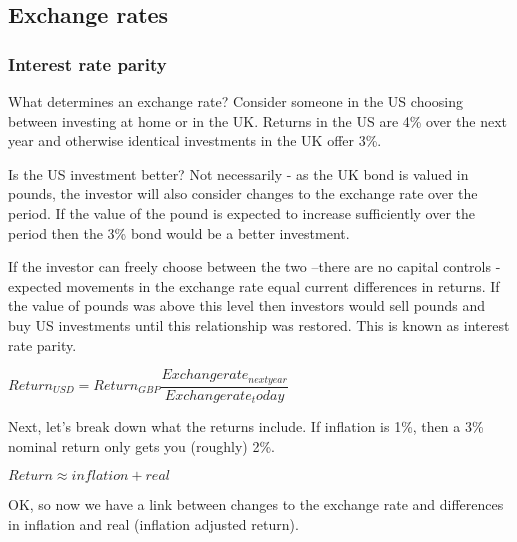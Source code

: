 
\subsection{Exchange rates}

\subsubsection{Interest rate parity}

What determines an exchange rate? Consider someone in the US choosing between investing at home or in the UK. Returns in the US are 4\% over the next year and otherwise identical investments in the UK offer 3\%.

Is the US investment better? Not necessarily - as the UK bond is valued in pounds, the investor will also consider changes to the exchange rate over the period. If the value of the pound is expected to increase sufficiently over the period then the 3\% bond would be a better investment.

If the investor can freely choose between the two –there are no capital controls - expected movements in the exchange rate equal current differences in returns. If the value of pounds was above this level then investors would sell pounds and buy US investments until this relationship was restored. This is known as interest rate parity.

\(Return_{USD} = Return_{GBP} \dfrac{Exchange rate_{next year}}{Exchange rate_today}\)

Next, let’s break down what the returns include. If inflation is 1\%, then a 3\% nominal return only gets you (roughly) 2\%.

\(Return \approx inflation + real\)

OK, so now we have a link between changes to the exchange rate and differences in inflation and real (inflation adjusted return).

